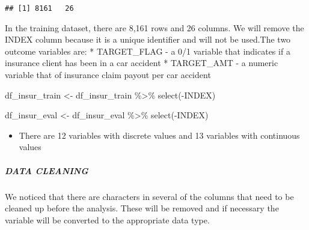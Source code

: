 \documentclass[
]{article}
\newenvironment{Shaded}{\begin{snugshade}}{\end{snugshade}}
\newcommand{\FunctionTok}[1]{\textcolor[rgb]{0.00,0.00,0.00}{#1}}
\newcommand{\NormalTok}[1]{#1}
\newcommand{\OtherTok}[1]{\textcolor[rgb]{0.56,0.35,0.01}{#1}}
\newcommand{\SpecialCharTok}[1]{\textcolor[rgb]{0.00,0.00,0.00}{#1}}
\providecommand{\tightlist}{%
  \setlength{\itemsep}{0pt}\setlength{\parskip}{0pt}}
\begin{document}
\begin{verbatim}
## [1] 8161   26
\end{verbatim}

In the training dataset, there are 8,161 rows and 26 columns. We will
remove the INDEX column because it is a unique identifier and will not
be used.The two outcome variables are: * TARGET\_FLAG - a 0/1 variable
that indicates if a insurance client has been in a car accident *
TARGET\_AMT - a numeric variable that of insurance claim payout per car
accident

\begin{Shaded}
\begin{Highlighting}[]
\NormalTok{df\_insur\_train }\OtherTok{\textless{}{-}}\NormalTok{ df\_insur\_train }\SpecialCharTok{\%\textgreater{}\%} 
  \FunctionTok{select}\NormalTok{(}\SpecialCharTok{{-}}\NormalTok{INDEX)}
\end{Highlighting}
\end{Shaded}

\begin{Shaded}
\begin{Highlighting}[]
\NormalTok{df\_insur\_eval }\OtherTok{\textless{}{-}}\NormalTok{ df\_insur\_eval }\SpecialCharTok{\%\textgreater{}\%} 
  \FunctionTok{select}\NormalTok{(}\SpecialCharTok{{-}}\NormalTok{INDEX)}
\end{Highlighting}
\end{Shaded}

\begin{itemize}
\tightlist
\item
  There are 12 variables with discrete values and 13 variables with
  continuous values
\end{itemize}

\hypertarget{data-cleaning}{%
\subparagraph{DATA CLEANING}\label{data-cleaning}}

We noticed that there are characters in several of the columns that need
to be cleaned up before the analysis. These will be removed and if
necessary the variable will be converted to the appropriate data type.
\end{document}

